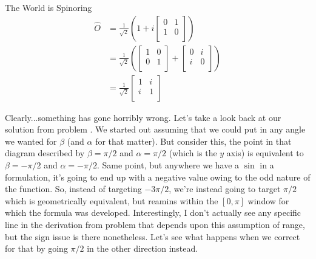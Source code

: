 \begin{answer}
\begin{answerpart}{The World is Spinoring}
    \begin{equation}
      \begin{split}
        \hat{O}
        &= 
        \frac{1}{\sqrt{2}}
        \left(
        1 + i
        \begin{bmatrix}
          0 & 1 \\
          1 & 0 \\
        \end{bmatrix}
        \right)
        \\
        &= 
        \frac{1}{\sqrt{2}}
        \left(
        \begin{bmatrix}
          1 & 0 \\
          0 & 1 \\
        \end{bmatrix}
        +
        \begin{bmatrix}
          0 & i \\
          i & 0 \\
        \end{bmatrix}
        \right)
        \\
        &= 
        \frac{1}{\sqrt{2}}
        \begin{bmatrix}
          1 & i \\
          i & 1 \\
        \end{bmatrix}
      \end{split}
    \end{equation}

    Clearly...something has gone horribly wrong.  Let's take a look
    back at our solution from problem .  We
    started out assuming that we could put in any angle we wanted for
    $\beta$ (and $\alpha$ for that matter).  But consider this, the
    point in that diagram described by $\beta=\pi/2$ and
    $\alpha=\pi/2$ (which is the $y$ axis) is equivalent to
    $\beta=-\pi/2$ and $\alpha=-\pi/2$.  Same point, but anywhere we
    have a $\sin$ in a formulation, it's going to end up with a
    negative value owing to the odd nature of the function.  So,
    instead of targeting $-3\pi/2$, we're instead going to target
    $\pi/2$ which is geometrically equivalent, but reamins within the
    $[0,\pi]$ window for which the formula was developed.
    Interestingly, I don't actually see any specific line in the
    derivation from problem  that depends
    upon this assumption of range, but the sign issue is there
    nonetheless.  Let's see what happens when we correct for that by
    going $\pi/2$ in the other direction instead.


\end{answerpart}
\end{answer}
